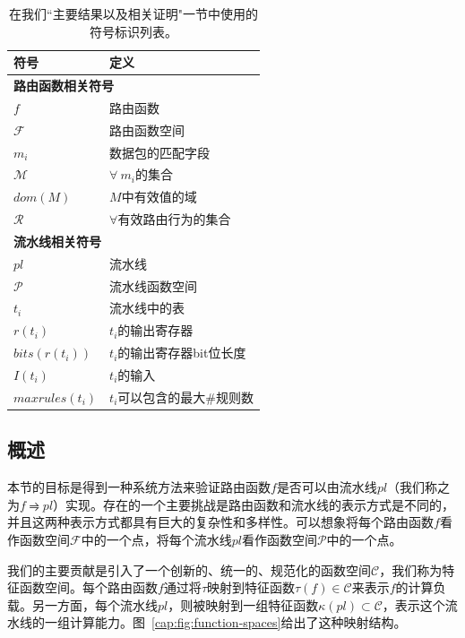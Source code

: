\begin{table}
\centering
\begin{tabular}{| l | l |}
  \hline
  \textbf{符号} & \textbf{定义}\\
  \hline
  \hline
  \multicolumn{2}{|l|}{\textbf{路由函数相关符号}} \\
  \hline
  $f$ & 路由函数\\
  $\mathcal{F}$ & 路由函数空间\\
  $m_i$ & 数据包的匹配字段\\
  $\mathcal{M}$ & $\forall\ m_i$的集合\\
  $dom(M)$ &  $M$中有效值的域\\
  $\mathcal{R}$ &  $\forall$有效路由行为的集合\\ 
  \hline
  \hline
  \multicolumn{2}{|l|}{\textbf{流水线相关符号}} \\
  \hline
  $pl$ & 流水线\\
  $\mathcal{P}$ & 流水线函数空间\\
  $t_i$ & 流水线中的表\\
  $r(t_i)$ & $t_i$的输出寄存器\\
  $bits(r(t_i))$ & $t_i$的输出寄存器bit位长度\\
  $I(t_i)$ & $t_i$的输入\\
  $maxrules(t_i)$ & $t_i$可以包含的最大$\#$规则数\\
  \hline
\end{tabular}
\vspace{2mm}
\label{cap:tbl:sym-table}
\caption{在我们``主要结果以及相关证明"一节中使用的符号标识列表。}
\end{table}

\subsection{概述}
本节的目标是得到一种系统方法来验证路由函数$f$是否可以由流水线$pl$（我们称之为$f \rightrightharpoons pl$）实现。存在的一个主要挑战是路由函数和流水线的表示方式是不同的，并且这两种表示方式都具有巨大的复杂性和多样性。可以想象将每个路由函数$f$看作函数空间$\mathcal{F}$中的一个点，将每个流水线$pl$看作函数空间$\mathcal{P}$中的一个点。 

我们的主要贡献是引入了一个创新的、统一的、规范化的函数空间$\mathcal{C}$，我们称为特征函数空间。每个路由函数$f$通过将$\tau$映射到特征函数$\tau(f) \in \mathcal{C}$来表示$f$的计算负载。另一方面，每个流水线$pl$，则被映射到一组特征函数$\kappa(pl) \subset \mathcal{C}$，表示这个流水线的一组计算能力。图~\ref{cap:fig:function-spaces}给出了这种映射结构。


